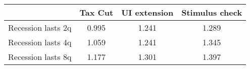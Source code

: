 \begin{tabular}{@{}lccc@{}} 
\toprule 
& Tax Cut    & UI extension    & Stimulus check    \\  \midrule 
Recession lasts 2q &0.995  & 1.241  & 1.289     \\ 
Recession lasts 4q &1.059  & 1.241  & 1.345     \\ 
Recession lasts 8q &1.177  & 1.301  & 1.397     \\ 
\end{tabular}  
